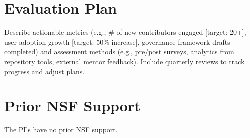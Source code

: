 \documentclass[11pt]{article}
\begin{document}
\section*{Evaluation Plan}
\vspace{-3pt}
\noindent
Describe actionable metrics (e.g., \# of new contributors engaged [target: 20+], user adoption growth [target: 50\% increase], governance framework drafts completed) and assessment methods (e.g., pre/post surveys, analytics from repository tools, external mentor feedback). Include quarterly reviews to track progress and adjust plans.
\vspace{-3pt}

\section{Prior NSF Support}
The PI's have no prior NSF support.
\newpage


\end{document}

